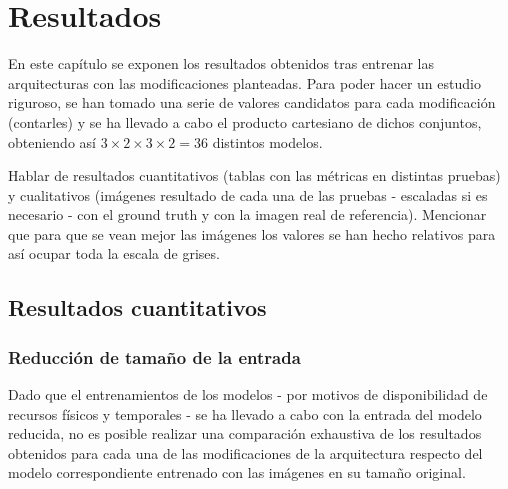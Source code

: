 \section{Resultados}

En este capítulo se exponen los resultados obtenidos tras entrenar las arquitecturas con las modificaciones planteadas. Para poder hacer un estudio riguroso, se han tomado una serie de valores candidatos para cada modificación (contarles) y se ha llevado a cabo el producto cartesiano de dichos conjuntos, obteniendo así $3 \times 2 \times 3 \times 2 = 36$ distintos modelos.

Hablar de resultados cuantitativos (tablas con las métricas en distintas pruebas) y cualitativos (imágenes resultado de cada una de las pruebas - escaladas si es necesario - con el ground truth y con la imagen real de referencia). Mencionar que para que se vean mejor las imágenes los valores se han hecho relativos para así ocupar toda la escala de grises.


\subsection{Resultados cuantitativos}

\subsubsection{Reducción de tamaño de la entrada}

Dado que el entrenamientos de los modelos - por motivos de disponibilidad de recursos físicos y temporales - se ha llevado a cabo con la entrada del modelo reducida, no es posible realizar una comparación exhaustiva de los resultados obtenidos para cada una de las modificaciones de la arquitectura respecto del modelo correspondiente entrenado con las imágenes en su tamaño original. 


